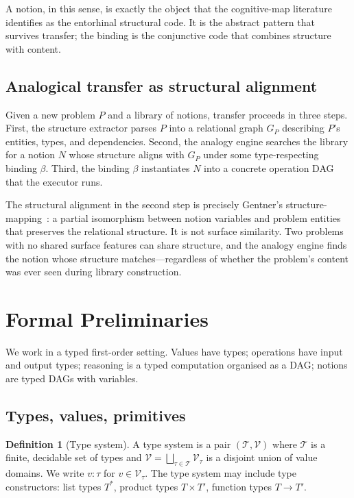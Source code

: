 \documentclass[11pt,a4paper]{article}
\theoremstyle{plain}
\theoremstyle{definition}
\newtheorem{definition}[theorem]{Definition}
\theoremstyle{remark}
\newcommand{\Types}{\mathcal{T}}
\newcommand{\Val}{\mathcal{V}}
\begin{document}
A notion, in this sense, is exactly the object that the cognitive-map literature identifies as the entorhinal structural code. It is the abstract pattern that survives transfer; the binding is the conjunctive code that combines structure with content.

\subsection{Analogical transfer as structural alignment}

Given a new problem $P$ and a library of notions, transfer proceeds in three steps. First, the structure extractor parses $P$ into a relational graph $G_P$ describing $P$'s entities, types, and dependencies. Second, the analogy engine searches the library for a notion $N$ whose structure aligns with $G_P$ under some type-respecting binding $\beta$. Third, the binding $\beta$ instantiates $N$ into a concrete operation DAG that the executor runs.

The structural alignment in the second step is precisely Gentner's structure-mapping~\cite{gentner1983structure}: a partial isomorphism between notion variables and problem entities that preserves the relational structure. It is not surface similarity. Two problems with no shared surface features can share structure, and the analogy engine finds the notion whose structure matches---regardless of whether the problem's content was ever seen during library construction.

\section{Formal Preliminaries}
\label{sec:prelim}

We work in a typed first-order setting. Values have types; operations have input and output types; reasoning is a typed computation organised as a DAG; notions are typed DAGs with variables.

\subsection{Types, values, primitives}

\begin{definition}[Type system]
\label{def:types}
A type system is a pair $(\Types, \Val)$ where $\Types$ is a finite, decidable set of types and $\Val = \bigsqcup_{\tau \in \Types} \Val_\tau$ is a disjoint union of value domains. We write $v : \tau$ for $v \in \Val_\tau$. The type system may include type constructors: list types $T^\ast$, product types $T \times T'$, function types $T \to T'$.
\end{definition}
\end{document}
